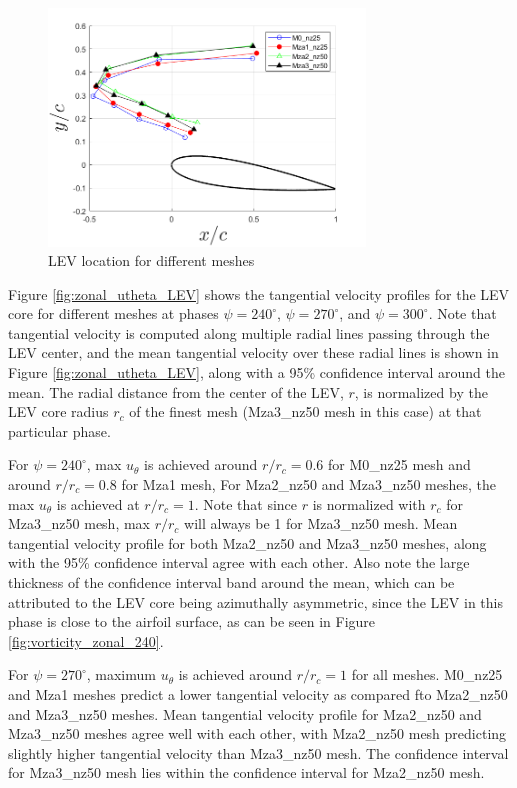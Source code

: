 \begin{figure}[H]
	\centering
	\includegraphics[width=0.75\textwidth]{figures/zonal_adapt_results/LEV/LEV_location}
	\caption{ LEV location for different meshes}
	\label{fig:zonal_LEV_location}
\end{figure}

Figure \ref{fig:zonal_utheta_LEV} shows the tangential velocity profiles for the LEV core for different meshes at phases  $\psi = 240^\circ$,  $\psi = 270^\circ$, and  $\psi = 300^\circ$. 
Note that tangential velocity is computed along multiple radial lines passing through the LEV center, and the mean tangential velocity over these radial lines is shown in Figure \ref{fig:zonal_utheta_LEV}, along with a 95\% confidence interval around the mean.
The radial distance from the center of the LEV, $r$, is normalized by the LEV core radius $r_c$ of the finest mesh (Mza3\_nz50 mesh in this case) at that particular phase. 

For $\psi = 240^\circ$, max $u_\theta$ is achieved around $r/r_c = 0.6$ for M0\_nz25 mesh and around $r/r_c = 0.8$ for Mza1 mesh, 
For Mza2\_nz50 and Mza3\_nz50 meshes, the max $u_\theta$ is achieved at $r/r_c = 1$. Note that since $r$ is normalized with $r_c$ for Mza3\_nz50 mesh, max $r/r_c$ will always be 1 for Mza3\_nz50 mesh. 
Mean tangential velocity profile for both Mza2\_nz50 and Mza3\_nz50 meshes, along with the 95\% confidence interval agree with each other. 
Also note the large thickness of the confidence interval band around the mean, which can be attributed to the LEV core being azimuthally asymmetric, since the LEV in this phase is close to the airfoil surface, as can be seen in Figure \ref{fig:vorticity_zonal_240}.

For $\psi = 270^\circ$, maximum $u_\theta$ is achieved around $r/r_c= 1$ for all meshes. 
M0\_nz25 and Mza1 meshes predict a lower tangential velocity as compared fto Mza2\_nz50 and Mza3\_nz50 meshes. 
Mean tangential velocity profile for Mza2\_nz50 and Mza3\_nz50 meshes agree well with each other, with Mza2\_nz50 mesh predicting slightly higher tangential velocity than Mza3\_nz50 mesh. 
The confidence interval for Mza3\_nz50 mesh lies within the confidence interval for Mza2\_nz50 mesh.

